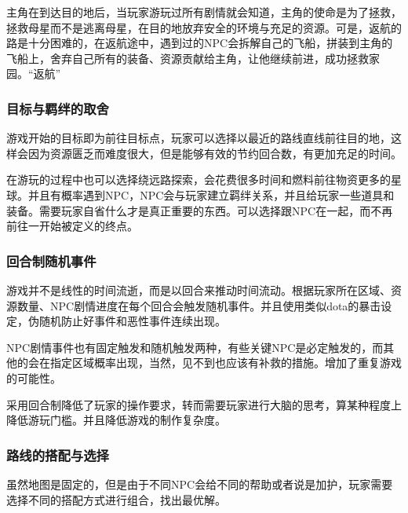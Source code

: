 \documentclass{ctexart}
\begin{document}
		主角在到达目的地后，当玩家游玩过所有剧情就会知道，主角的使命是为了拯救，拯救母星而不是逃离母星，在目的地放弃安全的环境与充足的资源。可是，返航的路是十分困难的，在返航途中，遇到过的NPC会拆解自己的飞船，拼装到主角的飞船上，舍弃自己所有的装备、资源贡献给主角，让他继续前进，成功拯救家园。“返航”
			\subsubsection{目标与羁绊的取舍}
		游戏开始的目标即为前往目标点，玩家可以选择以最近的路线直线前往目的地，这样会因为资源匮乏而难度很大，但是能够有效的节约回合数，有更加充足的时间。
			
		在游玩的过程中也可以选择绕远路探索，会花费很多时间和燃料前往物资更多的星球。并且有概率遇到NPC，NPC会与玩家建立羁绊关系，并且给玩家一些道具和装备。需要玩家自省什么才是真正重要的东西。可以选择跟NPC在一起，而不再前往一开始被定义的终点。
			\subsubsection{回合制随机事件}	
		游戏并不是线性的时间流逝，而是以回合来推动时间流动。根据玩家所在区域、资源数量、NPC剧情进度在每个回合会触发随机事件。并且使用类似dota的暴击设定，伪随机防止好事件和恶性事件连续出现。
		
		NPC剧情事件也有固定触发和随机触发两种，有些关键NPC是必定触发的，而其他的会在指定区域概率出现，当然，见不到也应该有补救的措施。增加了重复游戏的可能性。	
		
		采用回合制降低了玩家的操作要求，转而需要玩家进行大脑的思考，算某种程度上降低游玩门槛。并且降低游戏的制作复杂度。
			\subsubsection{路线的搭配与选择}
			虽然地图是固定的，但是由于不同NPC会给不同的帮助或者说是加护，玩家需要选择不同的搭配方式进行组合，找出最优解。
\end{document}
